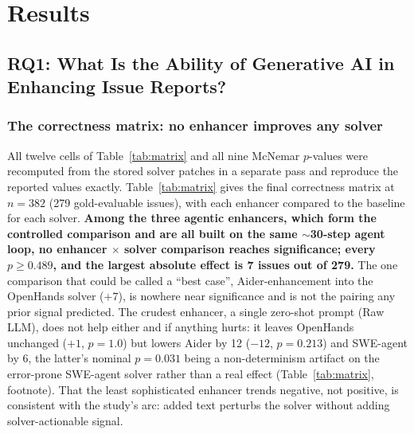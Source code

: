 \documentclass[journal]{IEEEtran}
\begin{document}
\section{Results}
\label{sec:results}

\subsection{RQ1: What Is the Ability of Generative AI in Enhancing Issue Reports?}

\subsubsection{The correctness matrix: no enhancer improves any solver}
All twelve cells of Table~\ref{tab:matrix} and all nine McNemar $p$-values were recomputed from the stored solver patches in a separate pass and reproduce the reported values exactly. Table~\ref{tab:matrix} gives the final correctness matrix at $n=382$ (279 gold-evaluable issues), with each enhancer compared to the baseline for each solver. \textbf{Among the three agentic enhancers, which form the controlled comparison and are all built on the same $\sim$30-step agent loop, no enhancer $\times$ solver comparison reaches significance; every $p \ge 0.489$, and the largest absolute effect is 7 issues out of 279.} The one comparison that could be called a ``best case'', Aider-enhancement into the OpenHands solver ($+7$), is nowhere near significance and is not the pairing any prior signal predicted. The crudest enhancer, a single zero-shot prompt (Raw LLM), does not help either and if anything hurts: it leaves OpenHands unchanged ($+1$, $p=1.0$) but lowers Aider by 12 ($-12$, $p=0.213$) and SWE-agent by 6, the latter's nominal $p=0.031$ being a non-determinism artifact on the error-prone SWE-agent solver rather than a real effect (Table~\ref{tab:matrix}, footnote). That the least sophisticated enhancer trends negative, not positive, is consistent with the study's arc: added text perturbs the solver without adding solver-actionable signal.
\end{document}
